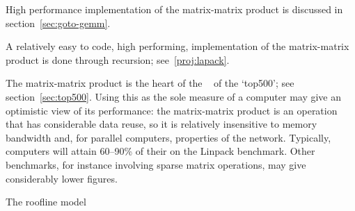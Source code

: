 \begin{nopackt}
  High performance implementation of the matrix-matrix product
  is discussed in section~\ref{sec:goto-gemm}.
\end{nopackt}
\begin{packt}
  A relatively easy to code, high performing, implementation
  of the matrix-matrix product is done through recursion;
  see~\ref{proj:lapack}.
\end{packt}

The matrix-matrix product is the heart of the
~\cite{Dongarra1987LinpackBenchmark}
of the `top500';
see section~\ref{sec:top500}.
Using this as the sole measure of
 a computer may give an optimistic view of its
performance: the matrix-matrix product is an operation
that has considerable data reuse, so it is relatively insensitive to
memory bandwidth and, for parallel computers, properties of the
network.
Typically, computers will attain 60--90\% of their
 on the Linpack benchmark.
Other benchmarks, for instance involving sparse matrix operations,
may give considerably lower figures.

 {The roofline model}
\label{sec:roofline}


